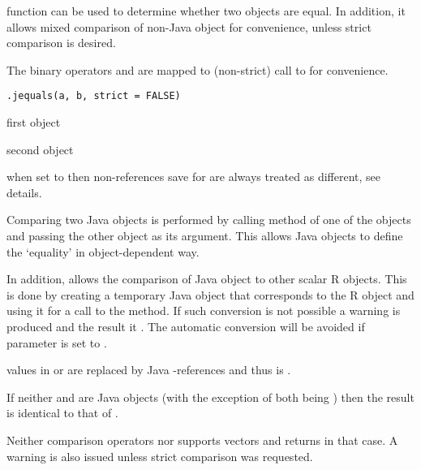 \begin{Description}\relax
{} function can be used to determine whether two objects
are equal. In addition, it allows mixed comparison of non-Java object
for convenience, unless strict comparison is desired.

The binary operators \code{==} and \code{!=} are mapped to
(non-strict) call to  for convenience.
\end{Description}
\begin{Usage}
\begin{verbatim}
.jequals(a, b, strict = FALSE)
\end{verbatim}
\end{Usage}
\begin{Arguments}
\begin{ldescription}
\item[\code{a}] first object
\item[\code{b}] second object
\item[\code{strict}] when set to  then non-references save for
 are always treated as different, see details.
\end{ldescription}
\end{Arguments}
\begin{Details}\relax
Comparing two Java objects is performed by calling 
method of one of the objects and passing the other object as its
argument. This allows Java objects to define the `equality' in
object-dependent way.

In addition,  allows the comparison of Java object to
other scalar R objects. This is done by creating a temporary Java
object that corresponds to the R object and using it for a call to the
 method. If such conversion is not possible a warning is
produced and the result it . The automatic conversion
will be avoided if  parameter is set to .

 values in  or  are replaced by Java
-references and thus  is .

If neither  and  are Java objects (with the exception
of both being ) then the result is identical to that of
.

Neither comparison operators nor  supports vectors and
returns  in that case. A warning is also issued unless
strict comparison was requested.
\end{Details}
